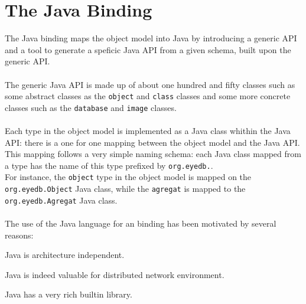 

\newcommand{\mantitle}{\textsc{Java Binding}}


\tableofcontents

\chapter*{The Java Binding}


The Java binding maps the \eyedb object model into Java by introducing
a generic API
and a tool to generate a speficic Java API from a given schema,
built upon the generic API.
\\
\\
The generic Java API is made up of about one hundred and fifty classes such
as some abstract classes as the \texttt{object} and \texttt{class} classes
and some more concrete classes such as the \texttt{database} and \texttt{image}
classes.
\\
\\
Each type in the \eyedb object model is implemented as a Java class whithin
the Java API: there is a one for one mapping between the object model and
the Java API.
\\
This mapping follows a very simple naming schema: each Java class mapped from
a type has the name of this type prefixed by \texttt{org.eyedb.}.
\\
For instance, the \texttt{object} type in the \eyedb object model is
mapped on the \texttt{org.eyedb.Object} Java class, while the
\texttt{agregat} is mapped to the \texttt{org.eyedb.Agregat} Java class.
\\
\\
The use of the Java language for an \eyedb binding has been motivated by
several reasons:
\bi
\item Java is architecture independent.
\item Java is indeed valuable for distributed network environment.
\item Java has a very rich builtin library.

